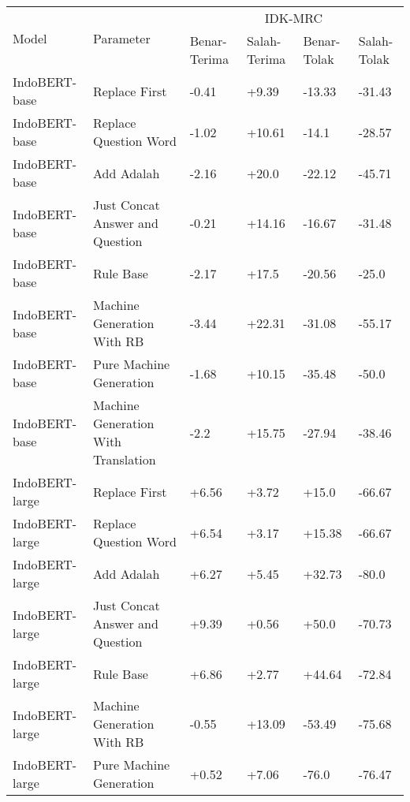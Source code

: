 \begin{table}[H]\centering
\scriptsize
\begin{tabular}{llllll}
\toprule
         \multirow{2}{*}{Model} &\multirow{2}{*}{Parameter} &\multicolumn{4}{c}{IDK-MRC} \\\cmidrule{3-6}
& &Benar-Terima &Salah-Terima &Benar-Tolak &Salah-Tolak \\\midrule
 IndoBERT-base &                       Replace First &        -0.41 &        +9.39 &      -13.33 &      -31.43 \\
 IndoBERT-base &               Replace Question Word &        -1.02 &       +10.61 &       -14.1 &      -28.57 \\
 IndoBERT-base &                          Add Adalah &        -2.16 &        +20.0 &      -22.12 &      -45.71 \\
 IndoBERT-base &     Just Concat Answer and Question &        -0.21 &       +14.16 &      -16.67 &      -31.48 \\
 IndoBERT-base &                           Rule Base &        -2.17 &        +17.5 &      -20.56 &       -25.0 \\
 IndoBERT-base &          Machine Generation With RB &        -3.44 &       +22.31 &      -31.08 &      -55.17 \\
 IndoBERT-base &             Pure Machine Generation &        -1.68 &       +10.15 &      -35.48 &       -50.0 \\
 IndoBERT-base & Machine Generation With Translation &         -2.2 &       +15.75 &      -27.94 &      -38.46 \\
\hline
IndoBERT-large &                       Replace First &        +6.56 &        +3.72 &       +15.0 &      -66.67 \\
IndoBERT-large &               Replace Question Word &        +6.54 &        +3.17 &      +15.38 &      -66.67 \\
IndoBERT-large &                          Add Adalah &        +6.27 &        +5.45 &      +32.73 &       -80.0 \\
IndoBERT-large &     Just Concat Answer and Question &        +9.39 &        +0.56 &       +50.0 &      -70.73 \\
IndoBERT-large &                           Rule Base &        +6.86 &        +2.77 &      +44.64 &      -72.84 \\
IndoBERT-large &          Machine Generation With RB &        -0.55 &       +13.09 &      -53.49 &      -75.68 \\
IndoBERT-large &             Pure Machine Generation &        +0.52 &        +7.06 &       -76.0 &      -76.47 \\

\end{tabular}
\end{table}
